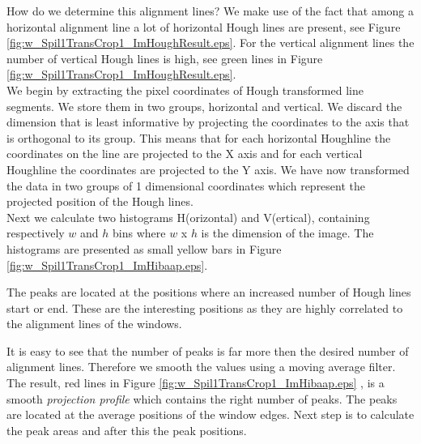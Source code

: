

How do we determine this alignment lines? We make use of the fact that among a
horizontal alignment line a lot of horizontal Hough lines are present, see
Figure \ref{fig:w_Spil1TransCrop1_ImHoughResult.eps}. For the vertical alignment lines
the number of vertical Hough lines is high, see green lines in Figure
\ref{fig:w_Spil1TransCrop1_ImHoughResult.eps}.\\

We begin by extracting the pixel coordinates of Hough transformed line
segments. We store them in two groups, horizontal and vertical.%
We discard the dimension that is least informative by projecting the coordinates to
the axis that is orthogonal to its group. 
This means that for each horizontal Houghline the coordinates on the line are projected to the X
axis and for each vertical Houghline the coordinates are projected to the Y
axis. We have now transformed the data in two groups of 1 dimensional
coordinates which represent the projected position of the Hough lines.\\

Next we calculate two histograms H(orizontal) and V(ertical), containing respectively
$w$ and $h$ bins where $w$ x $h$ is the dimension of the image.  The histograms
are presented as small yellow bars in Figure \ref{fig:w_Spil1TransCrop1_ImHibaap.eps}.

The peaks are located at the positions where an increased number of Hough lines
start or end.  These are the interesting positions as they are highly correlated
to the alignment lines of the windows. 

It is easy to see that the number of peaks is far more then the desired number of alignment lines.
Therefore we smooth the values using a moving average filter.
The result, red lines in Figure \ref{fig:w_Spil1TransCrop1_ImHibaap.eps}
, is a smooth \emph{projection profile} which contains the right number of peaks. The peaks
are located at the average positions of the window edges. Next step is to
calculate the peak areas and after this the peak positions. 

